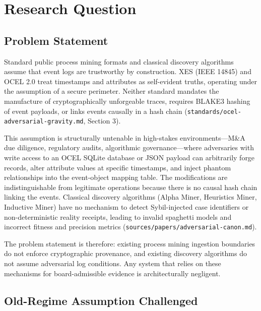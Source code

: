 
\section{Research Question}
\label{sec:adversarial-question}

\subsection{Problem Statement}
\label{sec:adversarial-question-problem}

Standard public process mining formats and classical discovery algorithms assume that event
logs are trustworthy by construction. XES (IEEE 14845) and OCEL 2.0 treat timestamps and
attributes as self-evident truths, operating under the assumption of a secure perimeter.
Neither standard mandates the manufacture of cryptographically unforgeable traces, requires
BLAKE3 hashing of event payloads, or links events causally in a hash chain
(\texttt{standards/ocel-adversarial-gravity.md}, Section 3).

This assumption is structurally untenable in high-stakes environments---M\&A due diligence,
regulatory audits, algorithmic governance---where adversaries with write access to an OCEL
SQLite database or JSON payload can arbitrarily forge records, alter attribute values at
specific timestamps, and inject phantom relationships into the event-object mapping table. The
modifications are indistinguishable from legitimate operations because there is no causal hash
chain linking the events. Classical discovery algorithms (Alpha Miner, Heuristics Miner,
Inductive Miner) have no mechanism to detect Sybil-injected case identifiers or
non-deterministic reality receipts, leading to invalid spaghetti models and incorrect fitness
and precision metrics (\texttt{sources/papers/adversarial-canon.md}).

The problem statement is therefore: existing process mining ingestion boundaries do not
enforce cryptographic provenance, and existing discovery algorithms do not assume adversarial
log conditions. Any system that relies on these mechanisms for board-admissible evidence is
architecturally negligent.

\subsection{Old-Regime Assumption Challenged}
\label{sec:adversarial-question-old-regime}

